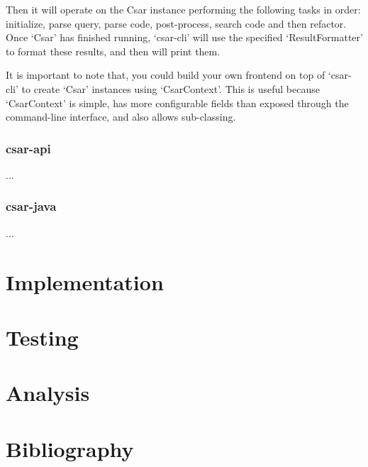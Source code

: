\documentclass[12pt, letterpaper]{article}
\begin{document}
Then it will operate on the Csar instance performing the following tasks in order: initialize, parse query, parse code, post-process, search code and then refactor.
Once `Csar' has finished running, `csar-cli' will use the specified `ResultFormatter' to format these results, and then will print them.

It is important to note that, you could build your own frontend on top of `csar-cli' to create `Csar' instances using `CsarContext'.
This is useful because `CsarContext' is simple, has more configurable fields than exposed through the command-line interface, and also allows sub-classing.

\subsubsection{csar-api}
...

\subsubsection{csar-java}
...

\section{Implementation}

\section{Testing}

\section{Analysis}

\section{Bibliography}
\printbibliography[heading=none]
\end{document}
